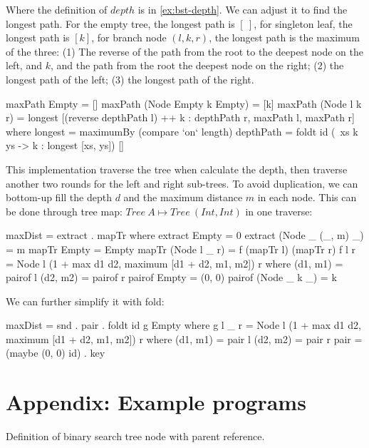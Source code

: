 \documentclass[b5paper]{article}
\begin{document}
\begin{Answer}[ref={ex:bst-delete}]
{Where the definition of $depth$ is in \cref{ex:bst-depth}. We can adjust it to find the longest path. For the empty tree, the longest path is $[\ ]$, for singleton leaf, the longest path is $[k]$, for branch node $(l, k, r)$, the longest path is the maximum of the three: (1) The reverse of the path from the root to the deepest node on the left, and $k$, and the path from the root the deepest node on the right; (2) the longest path of the left; (3) the longest path of the right.

\begin{Haskell}
maxPath Empty = []
maxPath (Node Empty k Empty) = [k]
maxPath (Node l k r) = longest [(reverse depthPath l) ++ k : depthPath r,
                         maxPath l, maxPath r] where
  longest = maximumBy (compare `on` length)
  depthPath = foldt id (\ xs k ys -> k : longest [xs, ys]) []
\end{Haskell}

This implementation traverse the tree when calculate the depth, then traverse another two rounds for the left and right sub-trees. To avoid duplication, we can bottom-up fill the depth $d$ and the maximum distance $m$ in each node. This can be done through tree map: $Tree\ A \mapsto Tree\ (Int, Int)$ in one traverse:

\begin{Haskell}
maxDist = extract . mapTr where
  extract Empty = 0
  extract (Node _ (_, m) _) = m
  mapTr Empty = Empty
  mapTr (Node l _ r) = f (mapTr l) (mapTr r)
  f l r = Node l (1 + max d1 d2, maximum [d1 + d2, m1, m2]) r where
    (d1, m1) = pairof l
    (d2, m2) = pairof r
    pairof Empty = (0, 0)
    pairof (Node _ k _) = k
\end{Haskell}

We can further simplify it with fold:

\begin{Haskell}
maxDist = snd . pair . foldt id g Empty where
  g l _ r = Node l (1 + max d1 d2, maximum [d1 + d2, m1, m2]) r where
    (d1, m1) = pair l
    (d2, m2) = pair r
  pair = (maybe (0, 0) id) . key
\end{Haskell}
}
\end{Answer}

\section{Appendix: Example programs}

Definition of binary search tree node with parent reference.
\end{document}
